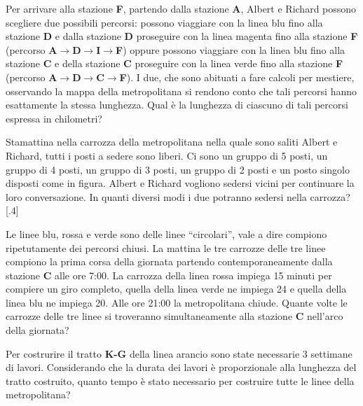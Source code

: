 \documentclass[12pt]{matemaj}
\begin{document}
\quesito[15;25]
Per arrivare alla stazione {\bf F}, partendo dalla stazione {\bf A}, Albert e Richard possono scegliere due possibili percorsi: possono viaggiare con la linea blu fino alla stazione {\bf D} e dalla stazione {\bf D} proseguire con la linea magenta fino alla stazione {\bf F} (percorso {\bf A$\rightarrow$D$\rightarrow$I$\rightarrow$F}) oppure possono viaggiare con la linea blu fino alla stazione {\bf C} e della stazione {\bf C} proseguire con la linea verde fino alla stazione {\bf F} (percorso {\bf A$\rightarrow$D$\rightarrow$C$\rightarrow$F}). I due, che sono abituati a fare calcoli per mestiere, osservando la mappa della metropolitana si rendono conto che tali percorsi hanno esattamente la stessa lunghezza. Qual è la lunghezza di ciascuno di tali percorsi espressa in chilometri?

\def\posto(#1,#2){\fill[rounded corners, blue] (#1+.1,#2+.1) rectangle (#1+.9,#2+.9)}
\vspace{-.8cm}
\quesitotc[10;30]
[.6]Stamattina nella carrozza della metropolitana nella quale sono saliti Albert e Richard, tutti i posti a sedere sono liberi. Ci sono un gruppo di 5 posti, un gruppo di 4 posti, un gruppo di 3 posti, un gruppo di 2 posti e un posto singolo disposti come in figura. Albert e Richard vogliono sedersi vicini per continuare la loro conversazione. In quanti diversi modi i due potranno sedersi nella carrozza?
[.4]\tikspace{}

\vspace{-.8cm}
\quesito[1;20]
Le linee blu, rossa e verde sono delle linee ``circolari'', vale a dire compiono ripetutamente dei percorsi chiusi. La mattina le tre carrozze delle tre linee compiono la prima corsa della giornata partendo contemporaneamente dalla stazione {\bf C} alle ore 7:00. La carrozza della linea rossa impiega 15 minuti per compiere un giro completo, quella della linea verde ne impiega 24 e quella della linea blu ne impiega 20. Alle ore 21:00 la metropolitana chiude. Quante volte le carrozze delle tre linee si troveranno simultaneamente alla stazione {\bf C} nell'arco della giornata?

\vspace{-.8cm}
\quesito[1;100]
Per costrurire il tratto {\bf K-G} della linea arancio sono state necessarie 3 settimane di lavori. Considerando che la durata dei lavori è proporzionale alla lunghezza del tratto costruito, quanto tempo è stato necessario per costruire tutte le linee della metropolitana?
\end{document}
